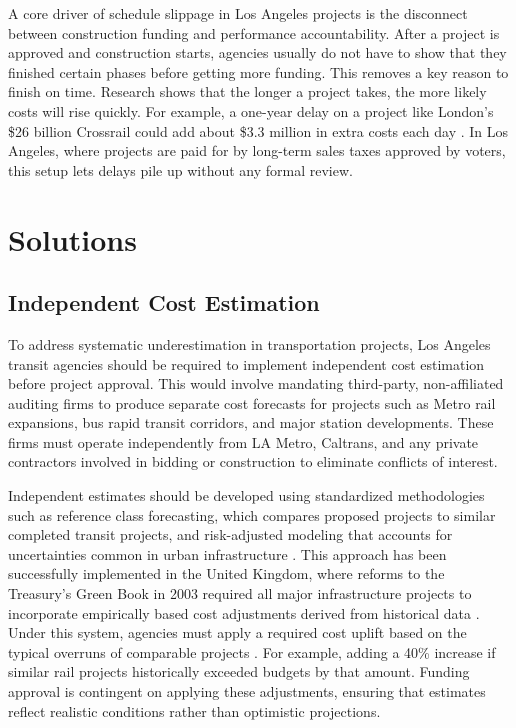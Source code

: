 \documentclass[12pt]{article}
\begin{document}
        A core driver of schedule slippage in Los Angeles projects is the disconnect between construction funding and performance accountability. After a project is approved and construction starts, agencies usually do not have to show that they finished certain phases before getting more funding. This removes a key reason to finish on time. Research shows that the longer a project takes, the more likely costs will rise quickly. For example, a one-year delay on a project like London's \$26 billion Crossrail could add about \$3.3 million in extra costs each day \cite{n9}. In Los Angeles, where projects are paid for by long-term sales taxes approved by voters, this setup lets delays pile up without any formal review.

    \newpage
    \section{Solutions}

        \subsection{Independent Cost Estimation}

        To address systematic underestimation in transportation projects, Los Angeles transit agencies should be required to implement independent cost estimation before project approval. This would involve mandating third-party, non-affiliated auditing firms to produce separate cost forecasts for projects such as Metro rail expansions, bus rapid transit corridors, and major station developments. These firms must operate independently from LA Metro, Caltrans, and any private contractors involved in bidding or construction to eliminate conflicts of interest.

        Independent estimates should be developed using standardized methodologies such as reference class forecasting, which compares proposed projects to similar completed transit projects, and risk-adjusted modeling that accounts for uncertainties common in urban infrastructure \cite{j8}. This approach has been successfully implemented in the United Kingdom, where reforms to the Treasury's Green Book in 2003 required all major infrastructure projects to incorporate empirically based cost adjustments derived from historical data \cite{j8}. Under this system, agencies must apply a required cost uplift based on the typical overruns of comparable projects \cite{j8}. For example, adding a 40\% increase if similar rail projects historically exceeded budgets by that amount. Funding approval is contingent on applying these adjustments, ensuring that estimates reflect realistic conditions rather than optimistic projections.
\end{document}
